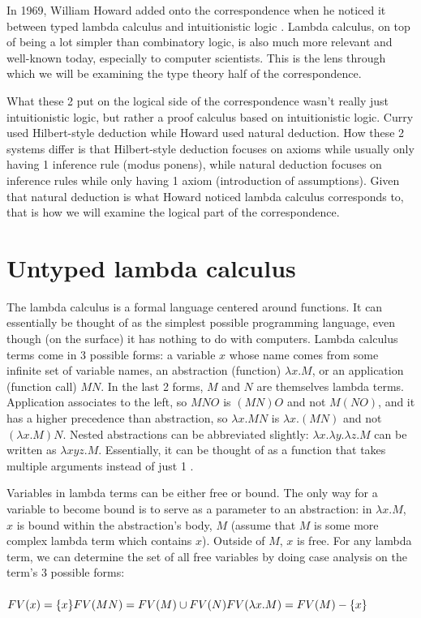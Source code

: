 \documentclass[12pt]{article}
\begin{document}
In 1969, William Howard added onto the correspondence when he noticed it between typed lambda calculus and intuitionistic logic \cite{howard}. Lambda calculus, on top of being a lot simpler than combinatory logic, is also much more relevant and well-known today, especially to computer scientists. This is the lens through which we will be examining the type theory half of the correspondence.

What these 2 put on the logical side of the correspondence wasn't really just intuitionistic logic, but rather a proof calculus based on intuitionistic logic. Curry used Hilbert-style deduction while Howard used natural deduction. How these 2 systems differ is that Hilbert-style deduction focuses on axioms while usually only having 1 inference rule (modus ponens), while natural deduction focuses on inference rules while only having 1 axiom (introduction of assumptions). Given that natural deduction is what Howard noticed lambda calculus corresponds to, that is how we will examine the logical part of the correspondence.

\section{Untyped lambda calculus}

The lambda calculus is a formal language centered around functions. It can essentially be thought of as the simplest possible programming language, even though (on the surface) it has nothing to do with computers. Lambda calculus terms come in 3 possible forms: a variable $x$ whose name comes from some infinite set of variable names, an abstraction (function) $\lambda x. M$, or an application (function call) $M N$. In the last 2 forms, $M$ and $N$ are themselves lambda terms. Application associates to the left, so $M N O$ is $(M N) O$ and not $M (N O)$, and it has a higher precedence than abstraction, so $\lambda x. M N$ is $\lambda x. (M N)$ and not $(\lambda x. M) N$. Nested abstractions can be abbreviated slightly: $\lambda x. \lambda y. \lambda z. M$ can be written as $\lambda xyz. M$. Essentially, it can be thought of as a function that takes multiple arguments instead of just 1 \cite{selinger}.

Variables in lambda terms can be either free or bound. The only way for a variable to become bound is to serve as a parameter to an abstraction: in $\lambda x. M$, $x$ is bound within the abstraction's body, $M$ (assume that $M$ is some more complex lambda term which contains $x$). Outside of $M$, $x$ is free. For any lambda term, we can determine the set of all free variables by doing case analysis on the term's 3 possible forms: \\
\\
$FV(x) = \{x\} \\
FV(M N) = FV(M) \cup FV(N) \\
FV(\lambda x. M) = FV(M) - \{x\} \\$
\end{document}
